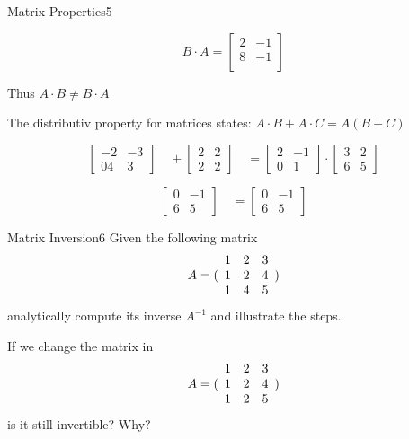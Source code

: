 \begin{questions}
\begin{question}{Matrix Properties}{5}
\begin{answer}
\begin{equation}
B \cdot A = \begin{bmatrix}
2 & -1 \\
8 & -1\\
\end{bmatrix}
\end{equation}

Thus $A \cdot B \neq B \cdot A$

The distributiv property for matrices states: $A\cdot B + A\cdot C = A (B+C)$ 


\[
\begin{bmatrix}
-2 & -3  \\
04 &  3 
\end{bmatrix}\quad
+
\begin{bmatrix}
2 & 2  \\
2 & 2 
\end{bmatrix}\quad
=
\begin{bmatrix}
2 & -1  \\
0 & 1 
\end{bmatrix}
\cdot
\begin{bmatrix}
3 & 2  \\
6 & 5
\end{bmatrix}
\]

\[
\begin{bmatrix}
0 & -1  \\
6 & 5 
\end{bmatrix}\quad
=
\begin{bmatrix}
0 & -1  \\
6 & 5
\end{bmatrix}
\]


\end{answer}

\end{question}


\begin{question}{Matrix Inversion}{6}
Given the following matrix 
\begin{equation*}
     A = ( \begin{array}{c c c} 
     1 & 2 & 3 \\
     1 & 2 & 4 \\
     1 & 4 & 5 \end{array} )
\end{equation*}
analytically compute its inverse $ A^{-1}$ and illustrate the steps.

If we change the matrix in
\begin{equation*}
     A = ( \begin{array}{c c c} 
     1 & 2 & 3 \\
     1 & 2 & 4 \\
     1 & 2 & 5 \end{array} )
\end{equation*}
is it still invertible? Why?


\end{question}
\end{questions}
